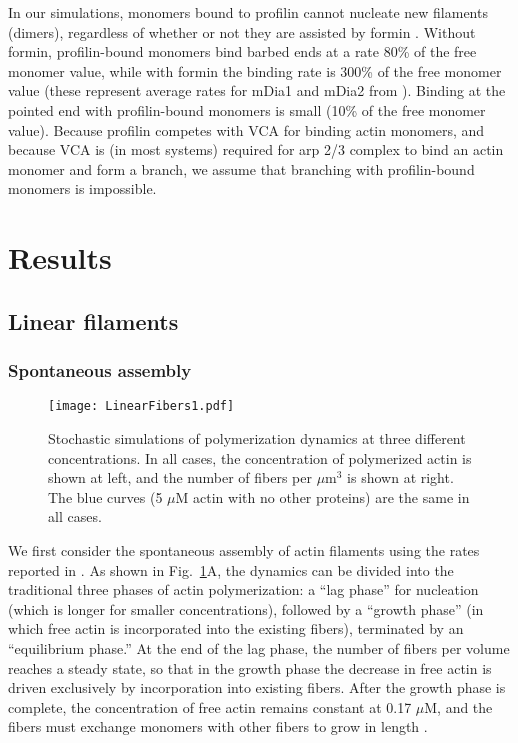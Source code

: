 \documentclass[11pt]{article}
\begin{document}
In our simulations, monomers bound to profilin cannot nucleate new filaments (dimers), regardless of whether or not they are assisted by formin \cite{paul2009review}. Without formin, profilin-bound monomers bind barbed ends at a rate 80\% of the free monomer value, while with formin the binding rate is 300\% of the free monomer value (these represent average rates for mDia1 and mDia2 from \cite{kovar2006control}). Binding at the pointed end with profilin-bound monomers is small (10\% of the free monomer value). Because profilin competes with VCA for binding actin monomers, and because VCA is (in most systems) required for arp 2/3 complex to bind an actin monomer and form a branch, we assume that branching with profilin-bound monomers is impossible. 

\section{Results \label{sec:FilAct}}

\subsection{Linear filaments}
\subsubsection{Spontaneous assembly}

\begin{figure}
\centering
\texttt{[image: LinearFibers1.pdf]}
\caption{\label{fig:ActinPolyMix}Stochastic simulations of polymerization dynamics at three different concentrations. In all cases, the concentration of polymerized actin is shown at left, and the number of fibers per $\mu$m$^3$ is shown at right. The blue curves (5 $\mu$M actin with no other proteins) are the same in all cases. }
\end{figure}

We first consider the spontaneous assembly of actin filaments using the rates reported in \cite{rosenbloom2021mechanism}. As shown in Fig.\ \ref{fig:ActinPolyMix}A, the dynamics can be divided into the traditional three phases of actin polymerization: a ``lag phase'' for nucleation (which is longer for smaller concentrations), followed by a ``growth phase'' (in which free actin is incorporated into the existing fibers), terminated by an ``equilibrium phase.'' At the end of the lag phase, the number of fibers per volume reaches a steady state, so that in the growth phase the decrease in free actin is driven exclusively by incorporation into existing fibers. After the growth phase is complete, the concentration of free actin remains constant at 0.17 $\mu$M, and the fibers must exchange monomers with other fibers to grow in length \cite{hu2007theoretical}.
\end{document}
